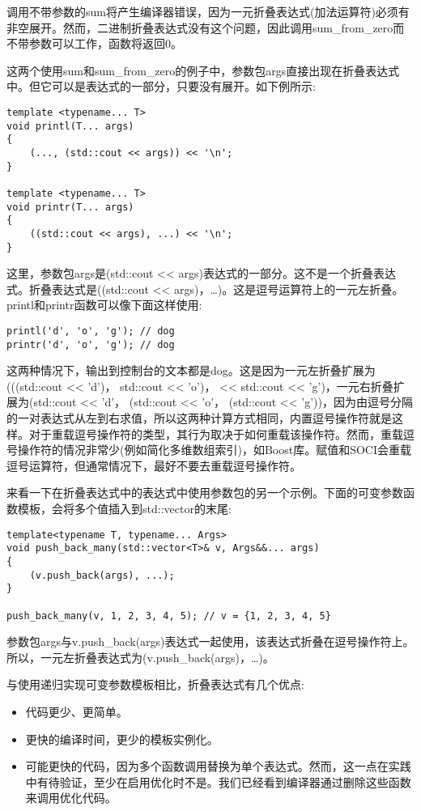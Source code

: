 调用不带参数的sum将产生编译器错误，因为一元折叠表达式(加法运算符)必须有非空展开。然而，二进制折叠表达式没有这个问题，因此调用sum\_from\_zero而不带参数可以工作，函数将返回0。

这两个使用sum和sum\_from\_zero的例子中，参数包args直接出现在折叠表达式中。但它可以是表达式的一部分，只要没有展开。如下例所示:

\begin{lstlisting}[style=styleCXX]
template <typename... T>
void printl(T... args)
{
	(..., (std::cout << args)) << '\n';
}

template <typename... T>
void printr(T... args)
{
	((std::cout << args), ...) << '\n';
}
\end{lstlisting}

这里，参数包args是(std::cout <{}< args)表达式的一部分。这不是一个折叠表达式。折叠表达式是((std::cout <{}< args)，…)。这是逗号运算符上的一元左折叠。printl和printr函数可以像下面这样使用:

\begin{lstlisting}[style=styleCXX]
printl('d', 'o', 'g'); // dog
printr('d', 'o', 'g'); // dog
\end{lstlisting}

这两种情况下，输出到控制台的文本都是dog。这是因为一元左折叠扩展为(((std::cout <{}< 'd')， std::cout <{}< 'o')， << std::cout <{}< 'g')，一元右折叠扩展为(std::cout <{}< 'd'， (std::cout <{}< 'o'， (std::cout <{}< 'g'))，因为由逗号分隔的一对表达式从左到右求值，所以这两种计算方式相同，内置逗号操作符就是这样。对于重载逗号操作符的类型，其行为取决于如何重载该操作符。然而，重载逗号操作符的情况非常少(例如简化多维数组索引)，如Boost库。赋值和SOCI会重载逗号运算符，但通常情况下，最好不要去重载逗号操作符。

来看一下在折叠表达式中的表达式中使用参数包的另一个示例。下面的可变参数函数模板，会将多个值插入到std::vector的末尾:

\begin{lstlisting}[style=styleCXX]
template<typename T, typename... Args>
void push_back_many(std::vector<T>& v, Args&&... args)
{
	(v.push_back(args), ...);
}

push_back_many(v, 1, 2, 3, 4, 5); // v = {1, 2, 3, 4, 5}
\end{lstlisting}

参数包args与v.push\_back(args)表达式一起使用，该表达式折叠在逗号操作符上。所以，一元左折叠表达式为(v.push\_back(args)，…)。

与使用递归实现可变参数模板相比，折叠表达式有几个优点:

\begin{itemize}
\item
代码更少、更简单。

\item
更快的编译时间，更少的模板实例化。

\item
可能更快的代码，因为多个函数调用替换为单个表达式。然而，这一点在实践中有待验证，至少在启用优化时不是。我们已经看到编译器通过删除这些函数来调用优化代码。
\end{itemize}

